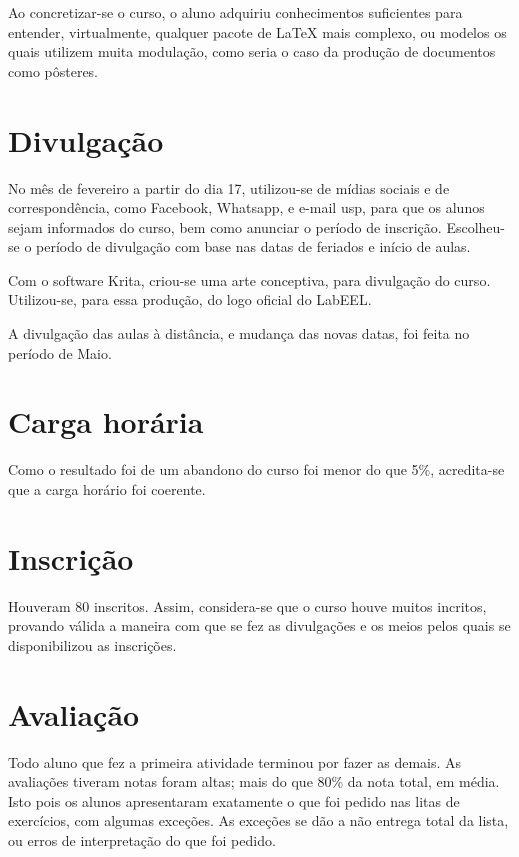 \documentclass[
12pt,				%
openright,			%
oneside,			%
a4paper,			%
english,			%
french,				%
spanish,			%
brazil,				%
]{abntex2}
\begin{document}
Ao concretizar-se o curso, o aluno adquiriu conhecimentos suficientes para entender, virtualmente, qualquer
pacote de \LaTeX{} mais complexo, ou modelos os quais utilizem muita
modulação, como seria o caso da produção de documentos como pôsteres.




\section{Divulgação}

No mês de fevereiro a partir do dia 17, utilizou-se de mídias sociais e de correspondência, como Facebook,
Whatsapp, e e-mail usp, para que os alunos sejam informados do curso,
bem como anunciar o período de inscrição. Escolheu-se o período de
divulgação com base nas datas de feriados e início de aulas.

Com o software Krita, criou-se uma arte conceptiva, para divulgação do
curso. Utilizou-se, para essa produção, do logo oficial do LabEEL.

A divulgação das aulas à distância, e mudança das  novas datas, foi feita no
período de Maio.

\section{Carga horária}
Como o resultado foi de um abandono do curso foi menor do que 5\%, acredita-se que a carga horário foi coerente.

\section{Inscrição}

Houveram 80 inscritos. Assim, considera-se que o curso houve muitos incritos, provando válida a maneira com que se fez as divulgações e os meios pelos quais se disponibilizou as inscrições.

\section{Avaliação}
Todo aluno que fez a primeira atividade terminou por fazer as demais. As avaliações tiveram notas foram altas; mais do que 80\% da nota total, em média. Isto pois os alunos apresentaram exatamente o que foi pedido nas litas de exercícios, com algumas exceções. As exceções se dão a não entrega total da lista, ou erros de interpretação do que foi pedido.
\end{document}
